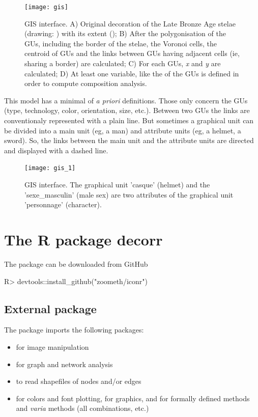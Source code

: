 \documentclass[article]{jss}
\begin{document}
\begin{figure}[H]
\centering
\texttt{[image: gis]}
\caption{\label{fig:gis} GIS interface. A) Original decoration of the Late Bronze Age  stelae (drawing: \cite{DiazGuardamino10}) with its extent (); B) After the polygonisation of the GUs, including the border of the stelae, the Voronoi cells, the centroid of GUs and the links between GUs having adjacent cells (ie, sharing a border) are calculated; C) For each GUs, \emph{x} and \emph{y} are calculated; D) At least one variable, like the  of the GUs is defined in order to compute composition analysis.}
\end{figure}

This model has a minimal of \emph{a priori} definitions. Those only concern the GUs (type, technology, color, orientation, size, etc.). Between two GUs the links are conventionaly represented with a plain line. But sometimes a graphical unit can be divided into a main unit (eg, a man) and attribute units (eg, a helmet, a sword). So, the links between the main unit and the attribute units are directed and displayed with a dashed line.

\begin{figure}[H]
\centering
\texttt{[image: gis\_1]}
\caption{\label{fig:gis1} GIS interface. The graphical unit 'casque' (helmet) and the 'sexe\_masculin' (male sex) are two attributes of the graphical unit 'personnage' (character).}
\end{figure}


\section{The R package decorr} \label{sec:models}

The  package can be downloaded from GitHub
%
\begin{CodeChunk}
\begin{CodeInput}
R>   devtools::install_github("zoometh/iconr")
\end{CodeInput}
\end{CodeChunk}
%

\subsection{External package} \label{sec:ext_pck}

The  package imports the following packages:
\begin{itemize}
\setlength\itemsep{.5em}
  \item {} for image manipulation \citep{Ooms18}
  \item {} for graph and network analysis \citep{Csardi06} 
  \item {}  to read shapefiles of nodes and/or edges \citep{Bivand19}
  \item {} for colors and font plotting,  for graphics,  and  for formally defined methods and \emph{varia} methods (all combinations, etc.) \citep{R19}
\end{itemize}
\end{document}
